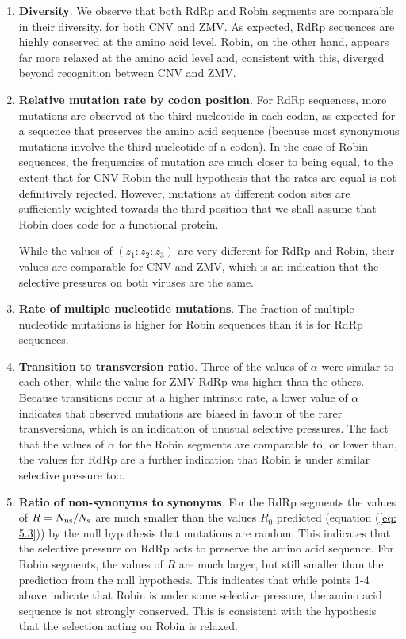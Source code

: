 \documentclass[unnumsec,webpdf,contemporary,large,namedate]{oup-authoring-template}%
\theoremstyle{thmstyleone}%
\theoremstyle{thmstyletwo}%
\theoremstyle{thmstylethree}%
\begin{document}
\begin{enumerate}

\item{\bf Diversity}. We observe that both RdRp and Robin
segments are comparable in their diversity, for both CNV and ZMV.
As expected, RdRp sequences are highly conserved at the amino acid level.
Robin, on the other hand, appears far more relaxed at the amino acid level and, consistent with this, diverged beyond recognition between CNV and ZMV.

\item{\bf Relative mutation rate by codon position}. For RdRp sequences, more mutations are observed
at the third nucleotide in each codon, as expected for a sequence that preserves the amino acid sequence
(because most synonymous mutations involve the third nucleotide of a codon). In the case of Robin sequences,
the frequencies of mutation are much closer to being equal, to the extent that for CNV-Robin the null hypothesis
that the rates are equal is not definitively rejected. However, mutations at different
codon sites are sufficiently weighted towards the third position that we shall assume that Robin
does code for a functional protein.

While the values of $(z_1:z_2:z_3)$ are very different for RdRp and Robin, their values are
comparable for CNV and ZMV, which is an indication that the selective pressures on both
viruses are the same.

\item{\bf Rate of multiple nucleotide mutations}. The fraction of multiple nucleotide mutations is
higher for Robin sequences than it is for RdRp sequences.

\item{\bf Transition to transversion ratio}. Three of the values of $\alpha$ were similar to each other, while the value
for ZMV-RdRp was higher than the others. Because transitions occur at a higher intrinsic rate, a lower
value of $\alpha$ indicates that observed mutations are biased in favour of the rarer transversions,
which is an indication of unusual selective pressures. The fact that the values of $\alpha$ for the Robin segments are
comparable to, or lower than, the values for RdRp are a further indication that Robin
is under similar selective pressure too.

\item{\bf Ratio of non-synonyms to synonyms}. For the RdRp segments the values of
$R=N_{\rm ns}/N_{\rm s}$ are much smaller than the values $R_0$
predicted (equation (\ref{eq: 5.3})) by the null hypothesis that mutations are random. This indicates that the selective
pressure on RdRp acts to preserve the amino acid sequence. For Robin segments, the values of $R$
are much larger, but still smaller than the prediction from the null hypothesis. This indicates that while
points 1-4 above indicate that Robin is under some selective pressure, the amino acid sequence
is not strongly conserved.
This is consistent with the hypothesis that the selection acting on Robin is relaxed.

\end{enumerate}
\end{document}
